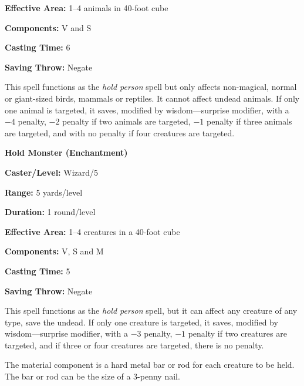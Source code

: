 \begin{multicols}{2}
\begin{minipage}{\columnwidth}
\noindent \textbf{Effective Area:} 1--4 animals in 40-foot cube

\noindent \textbf{Components:} V and S

\noindent \textbf{Casting Time:} 6

\noindent \textbf{Saving Throw:} Negate

\end{minipage}

This spell functions as the \textit{hold person} spell but only affects non-magical, normal or giant-sized birds, mammals or reptiles.  It cannot affect undead animals.  If only one animal is targeted, it saves, modified by wisdom---surprise modifier, with a $-4$ penalty, $-2$ penalty if two animals are targeted, $-1$ penalty if three animals are targeted, and with no penalty if four creatures are targeted.  

\vspace{1em}

\noindent
\begin{minipage}{\columnwidth}

\noindent \textbf{Hold Monster (Enchantment)}

\noindent \textbf{Caster/Level:} Wizard/5

\noindent \textbf{Range:} 5 yards/level

\noindent \textbf{Duration:} 1 round/level

\noindent \textbf{Effective Area:} 1--4 creatures in a 40-foot cube

\noindent \textbf{Components:} V, S and M

\noindent \textbf{Casting Time:} 5

\noindent \textbf{Saving Throw:} Negate

\end{minipage}

This spell functions as the \textit{hold person} spell, but it can affect any creature of any type, save the undead.  If only one creature is targeted, it saves, modified by wisdom---surprise modifier, with a $-3$ penalty, $-1$ penalty if two creatures are targeted, and if three or four creatures are targeted, there is no penalty.  

The material component is a hard metal bar or rod for each creature to be held.  The bar or rod can be the size of a 3-penny nail.

\vspace{1em}

\noindent
\begin{minipage}{\columnwidth}


\end{minipage}
\end{multicols}
